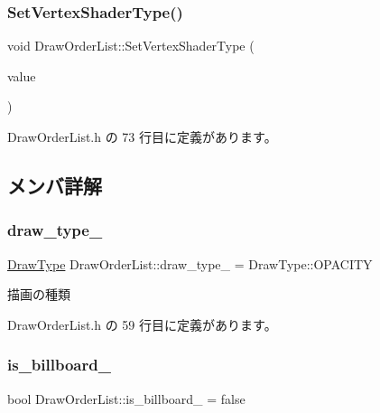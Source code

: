 \subsubsection{\texorpdfstring{Set\+Vertex\+Shader\+Type()}{SetVertexShaderType()}}
{\footnotesize\ttfamily void Draw\+Order\+List\+::\+Set\+Vertex\+Shader\+Type (\begin{DoxyParamCaption}\item[{\mbox{\hyperlink{class_shader_manager_a9b51e49d70eb3cc58f6d1f3994e8cfbd}{Shader\+Manager\+::\+Vertex\+Shader\+Type}}}]{value }\end{DoxyParamCaption})\hspace{0.3cm}{\ttfamily [inline]}}



 Draw\+Order\+List.\+h の 73 行目に定義があります。



\subsection{メンバ詳解}
\mbox{\label{class_draw_order_list_ad2ce43c1b177ba4dae4198aa272eeb23}} 
\subsubsection{\texorpdfstring{draw\+\_\+type\+\_\+}{draw\_type\_}}
{\footnotesize\ttfamily \mbox{\hyperlink{class_draw_order_list_a6c9b9ceb312c16d399ef355f4f3486bb}{Draw\+Type}} Draw\+Order\+List\+::draw\+\_\+type\+\_\+ = Draw\+Type\+::\+O\+P\+A\+C\+I\+TY\hspace{0.3cm}{\ttfamily [private]}}



描画の種類 



 Draw\+Order\+List.\+h の 59 行目に定義があります。

\mbox{\label{class_draw_order_list_ae9a77121ff108d8f0ee0c73065f99a75}} 
\subsubsection{\texorpdfstring{is\+\_\+billboard\+\_\+}{is\_billboard\_}}
{\footnotesize\ttfamily bool Draw\+Order\+List\+::is\+\_\+billboard\+\_\+ = false\hspace{0.3cm}{\ttfamily [private]}}



